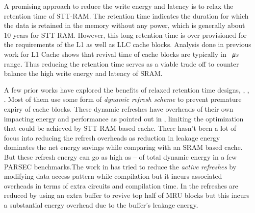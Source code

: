 \documentclass[sigconf]{acmart}
\begin{document}
    A promising approach to reduce the write energy and latency is to relax
the retention time of STT-RAM\cite{smullen}. The retention time indicates the duration for which the data is retained in the memory without any power, which is generally about 10 years for STT-RAM. However, this long retention time is over-provisioned for the requirements of the L1 as well as LLC cache blocks. Analysis done in previous work\cite{liang} for L1 Cache shows that revival time of cache blocks are typically in \textit{\SI{}{\micro\second}} range. Thus reducing the retention time serves as a viable trade off to counter balance the high write energy and latency of SRAM.

A few prior works have explored the benefits of relaxed retention time designs\cite{cache_revive}, \cite{compiler}, \cite{smullen}, \cite{sun}. Most of them use some form of  \textit{dynamic refresh scheme} to prevent premature expiry of cache blocks. These dynamic refreshes have overheads of their own impacting energy and performance as pointed out in \cite{compiler}, limiting the  optimization that could be achieved by STT-RAM based cache. There hasn't been a lot of focus into reducing the refresh overheads as reduction in leakage energy dominates the net energy savings while comparing with an SRAM based cache. But these refresh energy can go as high as -- of total dynamic energy in a few PARSEC benchmarks.The work in \cite{compiler} has tried to reduce the \textit{active refreshes} by modifying data access pattern while compilation but it incurs associated overheads in terms of extra circuits and compilation time. In \cite{cache_revive} the refreshes are reduced by using an extra buffer to revive top half of MRU blocks but this incurs a substantial energy overhead due to the buffer's leakage energy\cite{mirror_cache}.
\end{document}
